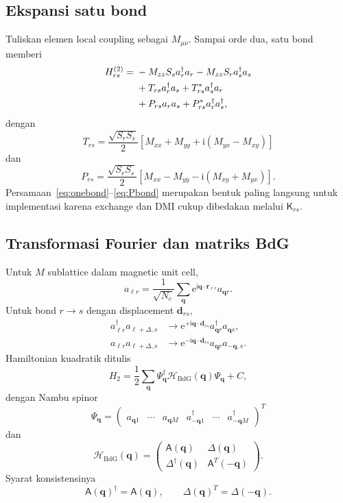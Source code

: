 \documentclass[11pt,a4paper]{article}
\newcommand{\ii}{\mathrm{i}}
\newcommand{\ee}{\mathrm{e}}
\newcommand{\vq}{\bm q}
\newcommand{\vr}{\bm r}
\newcommand{\mA}{\mathsf A}
\newcommand{\mH}{\mathcal H}
\begin{document}
\subsection{Ekspansi satu bond}

Tuliskan elemen local coupling sebagai $M_{\mu\nu}$. Sampai orde dua, satu bond memberi
\begin{align}
H_{rs}^{(2)}={}&
-M_{zz}S_s a_r^\dagger a_r
-M_{zz}S_r a_s^\dagger a_s\notag\\
&+T_{rs}a_r^\dagger a_s
+T_{rs}^*a_s^\dagger a_r\notag\\
&+P_{rs}a_ra_s
+P_{rs}^*a_r^\dagger a_s^\dagger,
\label{eq:onebond}
\end{align}
dengan
\begin{equation}
\boxed{
T_{rs}
=\frac{\sqrt{S_rS_s}}2
[M_{xx}+M_{yy}+\ii(M_{yx}-M_{xy})]
}
\label{eq:Tbond}
\end{equation}
dan
\begin{equation}
\boxed{
P_{rs}
=\frac{\sqrt{S_rS_s}}2
[M_{xx}-M_{yy}-\ii(M_{xy}+M_{yx})].
}
\label{eq:Pbond}
\end{equation}
Persamaan~\eqref{eq:onebond}--\eqref{eq:Pbond} merupakan bentuk paling langsung untuk implementasi karena exchange dan DMI cukup dibedakan melalui $\mathsf K_{rs}$.

\subsection{Transformasi Fourier dan matriks BdG}

Untuk $M$ sublattice dalam magnetic unit cell,
\begin{equation}
a_{\ell r}
=\frac1{\sqrt{N_c}}
\sum_{\vq}\ee^{\ii\vq\cdot\vr_{\ell r}}a_{\vq r}.
\end{equation}
Untuk bond $r\to s$ dengan displacement $\bm d_{rs}$,
\begin{align}
a_{\ell r}^\dagger a_{\ell+\Delta,s}
&\longrightarrow
\ee^{+\ii\vq\cdot\bm d_{rs}}
a_{\vq r}^\dagger a_{\vq s},\\
a_{\ell r}a_{\ell+\Delta,s}
&\longrightarrow
\ee^{-\ii\vq\cdot\bm d_{rs}}
a_{\vq r}a_{-\vq,s}.
\end{align}
Hamiltonian kuadratik ditulis
\begin{equation}
H_2=\frac12\sum_{\vq}
\Psi_{\vq}^\dagger
\mH_{\mathrm{BdG}}(\vq)
\Psi_{\vq}+C,
\end{equation}
dengan Nambu spinor
\begin{equation}
\Psi_{\vq}=
\begin{pmatrix}
a_{\vq1}&\cdots&a_{\vq M}&
a_{-\vq1}^\dagger&\cdots&a_{-\vq M}^\dagger
\end{pmatrix}^{T}
\end{equation}
dan
\begin{equation}
\boxed{
\mH_{\mathrm{BdG}}(\vq)
=\begin{pmatrix}
\mA(\vq)&\Delta(\vq)\\
\Delta^\dagger(\vq)&\mA^T(-\vq)
\end{pmatrix}.}
\label{eq:bdg}
\end{equation}
Syarat konsistensinya
\begin{equation}
\mA(\vq)^\dagger=\mA(\vq),
\qquad
\Delta(\vq)^T=\Delta(-\vq).
\end{equation}
\end{document}
